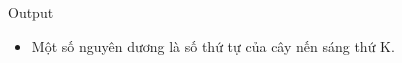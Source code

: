 Output
\begin{itemize}
	\item Một số nguyên dương là số thứ tự của cây nến sáng thứ K.
\end{itemize}
